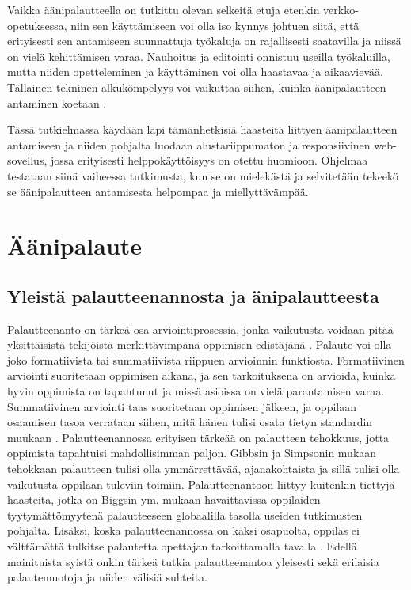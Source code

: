 \documentclass[utf8]{gradu3}
\begin{document}
Vaikka äänipalautteella on tutkittu olevan selkeitä etuja etenkin verkko-opetuksessa, niin sen käyttämiseen voi olla iso kynnys johtuen siitä, että erityisesti sen antamiseen suunnattuja työkaluja on rajallisesti saatavilla ja niissä on vielä kehittämisen varaa. Nauhoitus ja editointi onnistuu useilla työkaluilla, mutta niiden opetteleminen ja käyttäminen voi olla haastavaa ja aikaavievää. Tällainen tekninen alkukömpelyys voi vaikuttaa siihen, kuinka äänipalautteen antaminen koetaan \parencite[][]{versus}.

Tässä tutkielmassa käydään läpi tämänhetkisiä haasteita liittyen äänipalautteen antamiseen ja niiden pohjalta luodaan alustariippumaton ja responsiivinen web-sovellus, jossa erityisesti helppokäyttöisyys on otettu huomioon. Ohjelmaa testataan siinä vaiheessa tutkimusta, kun se on mielekästä ja selvitetään tekeekö se äänipalautteen antamisesta helpompaa ja miellyttävämpää.

\chapter{Äänipalaute}

\section{Yleistä palautteenannosta ja änipalautteesta}

Palautteenanto on tärkeä osa arviointiprosessia, jonka vaikutusta voidaan pitää yksittäisistä tekijöistä merkittävimpänä oppimisen edistäjänä \parencite[][]{gibbs2004}. Palaute voi olla joko formatiivista tai summatiivista riippuen arvioinnin funktiosta. Formatiivinen arviointi suoritetaan oppimisen aikana, ja sen tarkoituksena on arvioida, kuinka hyvin oppimista on tapahtunut ja missä asioissa on vielä parantamisen varaa. Summatiivinen arviointi taas suoritetaan oppimisen jälkeen, ja oppilaan osaamisen tasoa verrataan siihen, mitä hänen tulisi osata tietyn standardin muukaan \parencite[][]{biggs2011}. Palautteenannossa erityisen tärkeää on palautteen tehokkuus, jotta oppimista tapahtuisi mahdollisimman paljon. Gibbsin ja Simpsonin \parencite[][]{gibbs2004} mukaan tehokkaan palautteen tulisi olla ymmärrettävää, ajanakohtaista ja sillä tulisi olla vaikutusta oppilaan tuleviin toimiin. Palautteenantoon liittyy kuitenkin tiettyjä haasteita, jotka on Biggsin ym. \parencite[][]{biggs2011} mukaan havaittavissa oppilaiden tyytymättömyytenä palautteeseen globaalilla tasolla useiden tutkimusten pohjalta. Lisäksi, koska palautteenannossa on kaksi osapuolta, oppilas ei välttämättä tulkitse palautetta opettajan tarkoittamalla tavalla \parencite[][]{sadler2010}. Edellä mainituista syistä onkin tärkeä tutkia palautteenantoa yleisesti sekä erilaisia palautemuotoja ja niiden välisiä suhteita. 
\end{document}
